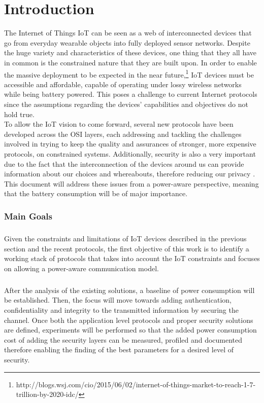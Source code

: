 
\chapter{Introduction}
\label{chapter:introduction}
The Internet of Things \gls{IoT} can be seen as a web of interconnected devices that go from everyday wearable objects into fully deployed sensor networks. Despite the huge variety and characteristics of these devices, one thing that they all have in common is the constrained nature that they are built upon. In order to enable the massive deployment to be expected in the near future,\footnote{http://blogs.wsj.com/cio/2015/06/02/internet-of-things-market-to-reach-1-7-trillion-by-2020-idc/} \gls{IoT} devices must be accessible and affordable, capable of operating under lossy wireless networks while being battery powered. This poses a challenge to current Internet protocols since the assumptions regarding the devices' capabilities and objectives do not hold true.\\ To allow the \gls{IoT} vision to come forward, several new protocols have been developed across the OSI layers, each addressing and tackling the challenges involved in trying to keep the quality and assurances of stronger, more expensive protocols, on constrained systems.
Additionally, security is also a very important due to the fact that the interconnection of the devices around us can provide information about our choices and whereabouts, therefore reducing our privacy \cite{Ukil2015}.
This document will address these issues from a power-aware perspective, meaning that the battery consumption will be of major importance.

\subsection{Main Goals}

\paragraph{}
Given the constraints and limitations of \gls{IoT} devices described in the previous section and the recent protocols, the first objective of this work is to identify a working stack of protocols that takes into account the \gls{IoT} constraints and focuses on allowing a power-aware communication model.

\paragraph{}
After the analysis of the existing solutions, a baseline of power consumption will be established. Then, the focus will move towards adding authentication, confidentiality and integrity to the transmitted information by securing the channel.
Once both the application level protocols and proper security solutions are defined, experiments will be performed so that the added power consumption cost of adding the security layers can be measured, profiled and documented therefore enabling the finding of the best parameters for a desired level of security.

